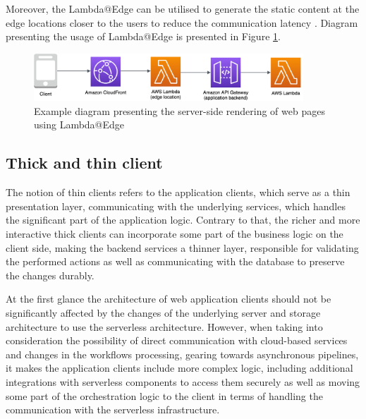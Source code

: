 Moreover, the Lambda@Edge can be utilised to generate the static content at the edge locations closer to the users to reduce the communication latency \cite{BuildingServerSideRenderingForReactInAwsLambda}.
Diagram presenting the usage of Lambda@Edge is presented in Figure \ref{fig:pattern-client-server-side-rendering-edge}.

\begin{figure}[H]
   \centering
   \includegraphics[width=0.9\textwidth]{assets/04-serverless-for-web-apps/serverSideRenderingEdge.png}
   \caption{Example diagram presenting the server-side rendering of web pages using Lambda@Edge}
   \label{fig:pattern-client-server-side-rendering-edge}
\end{figure}

\subsection{Thick and thin client}

The notion of thin clients refers to the application clients, which serve as a thin presentation layer, communicating with the underlying services, which handles the significant part of the application logic.
Contrary to that, the richer and more interactive thick clients can incorporate some part of the business logic on the client side, making the backend services a thinner layer, responsible for validating the performed actions as well as communicating with the database to preserve the changes durably.

At the first glance the architecture of web application clients should not be significantly affected by the changes of the underlying server and storage architecture to use the serverless architecture.
However, when taking into consideration the possibility of direct communication with cloud-based services and changes in the workflows processing, gearing towards asynchronous pipelines, it makes the application clients include more complex logic, including additional integrations with serverless components to access them securely as well as moving some part of the orchestration logic to the client in terms of handling the communication with the serverless infrastructure.


